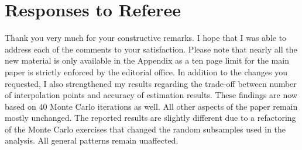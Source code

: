 \newpage\section*{Responses to Referee}\vspace{1.0cm}
Thank you very much for your constructive remarks. I hope that I was able to address each of the comments to your satisfaction. Please note that nearly all the new material is only available in the Appendix as a ten page limit for the main paper is strictly enforced by the editorial office. In addition to the changes you requested, I also strengthened my results regarding the trade-off between number of interpolation points and accuracy of estimation results. These findings are now based on 40 Monte Carlo iterations as well. All other aspects of the paper remain mostly unchanged. The reported results are slightly different due to a refactoring of the Monte Carlo exercises that changed the random subsamples used in the analysis. All general patterns remain unaffected.

